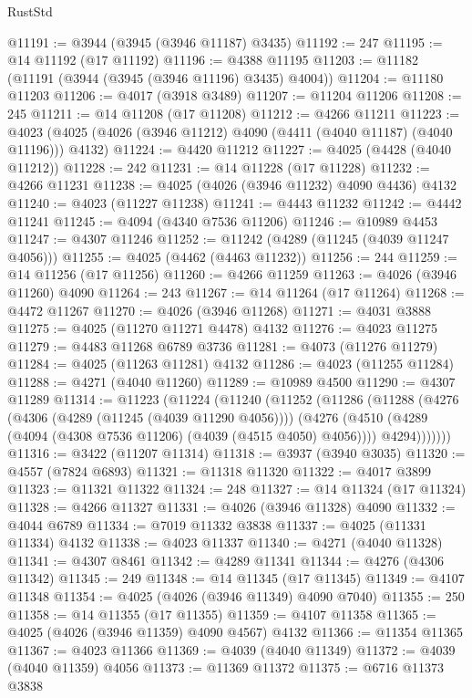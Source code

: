 \begin{lexlean}{RustStd}
\begin{coremodule}
@11191 := @3944 (@3945 (@3946 @11187) @3435)
@11192 := 247
@11195 := @14 @11192 (@17 @11192)
@11196 := @4388 @11195
@11203 := @11182 (@11191 (@3944 (@3945 (@3946 @11196) @3435) @4004))
@11204 := @11180 @11203
@11206 := @4017 (@3918 @3489)
@11207 := @11204 @11206
@11208 := 245
@11211 := @14 @11208 (@17 @11208)
@11212 := @4266 @11211
@11223 := @4023 (@4025 (@4026 (@3946 @11212) @4090 (@4411 (@4040 @11187) (@4040 @11196))) @4132)
@11224 := @4420 @11212
@11227 := @4025 (@4428 (@4040 @11212))
@11228 := 242
@11231 := @14 @11228 (@17 @11228)
@11232 := @4266 @11231
@11238 := @4025 (@4026 (@3946 @11232) @4090 @4436) @4132
@11240 := @4023 (@11227 @11238)
@11241 := @4443 @11232
@11242 := @4442 @11241
@11245 := @4094 (@4340 @7536 @11206)
@11246 := @10989 @4453
@11247 := @4307 @11246
@11252 := @11242 (@4289 (@11245 (@4039 @11247 @4056)))
@11255 := @4025 (@4462 (@4463 @11232))
@11256 := 244
@11259 := @14 @11256 (@17 @11256)
@11260 := @4266 @11259
@11263 := @4026 (@3946 @11260) @4090
@11264 := 243
@11267 := @14 @11264 (@17 @11264)
@11268 := @4472 @11267
@11270 := @4026 (@3946 @11268)
@11271 := @4031 @3888
@11275 := @4025 (@11270 @11271 @4478) @4132
@11276 := @4023 @11275
@11279 := @4483 @11268 @6789 @3736
@11281 := @4073 (@11276 @11279)
@11284 := @4025 (@11263 @11281) @4132
@11286 := @4023 (@11255 @11284)
@11288 := @4271 (@4040 @11260)
@11289 := @10989 @4500
@11290 := @4307 @11289
@11314 := @11223
    (@11224
      (@11240
        (@11252
          (@11286
            (@11288
              (@4276
                (@4306 (@4289 (@11245 (@4039 @11290 @4056))))
                (@4276
                  (@4510 (@4289 (@4094 (@4308 @7536 @11206) (@4039 (@4515 @4050) @4056))))
                  @4294)))))))
@11316 := @3422 (@11207 @11314)
@11318 := @3937 (@3940 @3035)
@11320 := @4557 (@7824 @6893)
@11321 := @11318 @11320
@11322 := @4017 @3899
@11323 := @11321 @11322
@11324 := 248
@11327 := @14 @11324 (@17 @11324)
@11328 := @4266 @11327
@11331 := @4026 (@3946 @11328) @4090
@11332 := @4044 @6789
@11334 := @7019 @11332 @3838
@11337 := @4025 (@11331 @11334) @4132
@11338 := @4023 @11337
@11340 := @4271 (@4040 @11328)
@11341 := @4307 @8461
@11342 := @4289 @11341
@11344 := @4276 (@4306 @11342)
@11345 := 249
@11348 := @14 @11345 (@17 @11345)
@11349 := @4107 @11348
@11354 := @4025 (@4026 (@3946 @11349) @4090 @7040)
@11355 := 250
@11358 := @14 @11355 (@17 @11355)
@11359 := @4107 @11358
@11365 := @4025 (@4026 (@3946 @11359) @4090 @4567) @4132
@11366 := @11354 @11365
@11367 := @4023 @11366
@11369 := @4039 (@4040 @11349)
@11372 := @4039 (@4040 @11359) @4056
@11373 := @11369 @11372
@11375 := @6716 @11373 @3838

\end{coremodule}
\end{lexlean}
